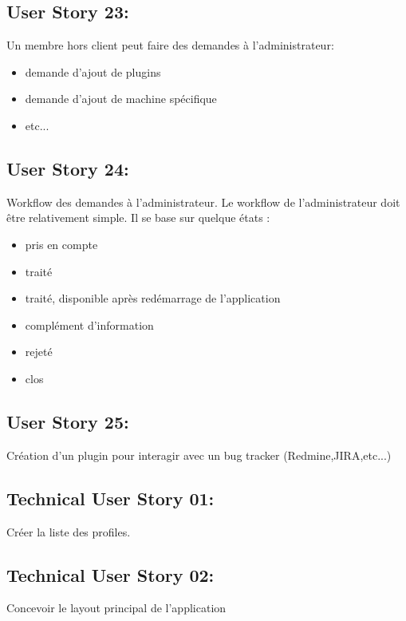 	\subsection{User Story 23:}
	Un membre hors client peut faire des demandes à l'administrateur:
			\begin{itemize}
				\item demande d'ajout de plugins
				\item demande d'ajout de machine spécifique
				\item etc...
			\end{itemize}

	\subsection{User Story 24:}
	Workflow des demandes à l'administrateur.  Le workflow de l'administrateur doit être relativement
	simple. Il se base sur quelque états :
	
			\begin{itemize}
				\item pris en compte
				\item traité
				\item traité, disponible après redémarrage de l'application
				\item complément d'information
				\item rejeté
				\item clos
			\end{itemize}

	\subsection{User Story 25:}
	Création d'un plugin pour interagir avec un bug tracker (Redmine,JIRA,etc...)
	
	\subsection{Technical User Story 01:}
	Créer la liste des profiles.
	
	\subsection{Technical User Story 02:}
	Concevoir le layout principal de l'application
	
